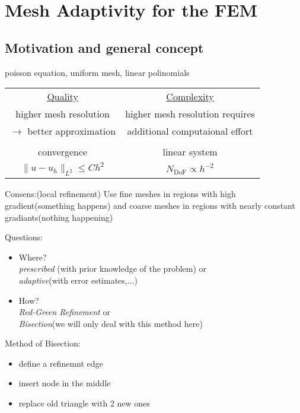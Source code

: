 \section{Mesh Adaptivity for the FEM}
\subsection{Motivation and general concept}

\begin{example}
	poisson equation, uniform mesh, linear polinomials
\end{example}
\begin{center}
	\begin{tabular}{c | c}
		\underline{Quality} & \underline{Complexity}\\
		higher mesh resolution & higher mesh resolution requires \\
		$\to$ better approximation & additional computaional effort\\
		&  \\
		convergence & linear system \\
		$\|u-u_h\|_{L^2} \leq C h^2$ & $N_{\text{DoF}}\propto h^{-2}$
	\end{tabular}
\end{center}

Consens:(local refinement) Use fine meshes in regions with high gradient(something happens) and coarse meshes in regions with nearly constant gradiants(nothing happening)\vspace{1cm}

Questions:
\begin{itemize}
	\item Where?\\
		\textit{prescribed} (with prior knowledge of the problem) or \\
		\textit{adaptive}(with error estimates,...)
	\item How?\\
		\textit{Red-Green Refinement} or \\
		\textit{Bisection}(we will only deal with this method here)
\end{itemize}

Method of Bisection:
\begin{itemize}
	\item define a refinemnt edge
	\item insert node in the middle
	\item replace old triangle with 2 new ones 
\end{itemize}


